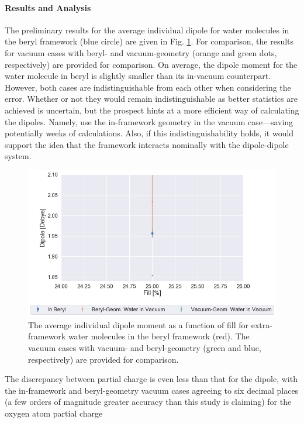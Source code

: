         \paragraph{Results and Analysis} The preliminary results for the average individual dipole for water molecules in the beryl framework (blue circle) are given in Fig. \ref{fig:pc_beryl_pc}. For comparison, the results for vacuum cases with beryl- and vacuum-geometry (orange and green dots, respectively) are provided for comparison. On average, the dipole moment for the water molecule in beryl is slightly smaller than its in-vacuum counterpart. However, both cases are indistinguishable from each other when considering the error. Whether or not they would remain indistinguishable as better statistics are achieved is uncertain, but the prospect hints at a more efficient way of calculating the dipoles. Namely, use the in-framework geometry in the vacuum case---saving potentially weeks of calculations. Also, if this indistinguishability holds, it would support the idea that the framework interacts nominally with the dipole-dipole system.
        
        \begin{figure}
            \centering
            \includegraphics[width=0.9\linewidth]{Figures/System/pc_beryl_pc.png}
            \caption{The average individual dipole moment as a function of fill for extra-framework water molecules in the beryl framework (red). The vacuum cases with vacuum- and beryl-geometry (green and blue, respectively) are provided for comparison.}
            \label{fig:pc_beryl_pc}
        \end{figure}
        
        The discrepancy between partial charge is even less than that for the dipole, with the in-framework and beryl-geometry vacuum cases agreeing to six decimal places (a few orders of magnitude greater accuracy than this study is claiming) for the oxygen atom partial charge
        

